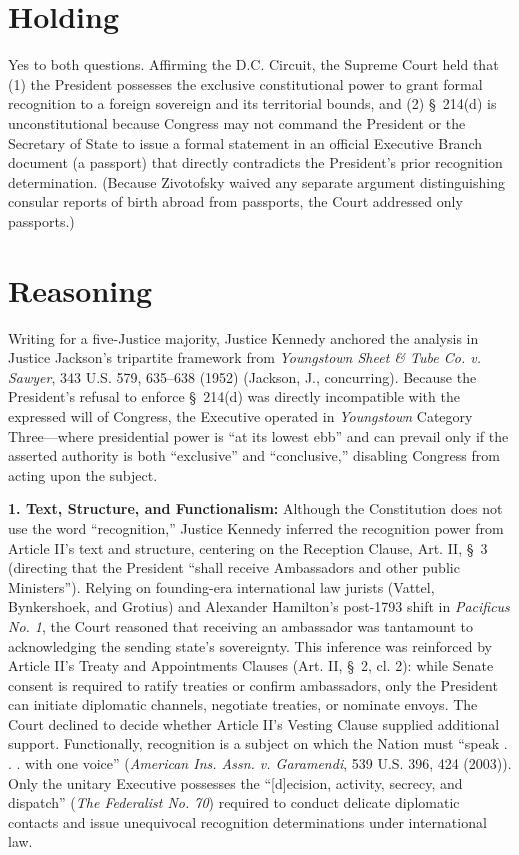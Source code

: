 \documentclass[12pt]{article}
\begin{document}
\section{Holding}
Yes to both questions. Affirming the D.C. Circuit, the Supreme Court held that (1) the President possesses the exclusive constitutional power to grant formal recognition to a foreign sovereign and its territorial bounds, and (2) \S~214(d) is unconstitutional because Congress may not command the President or the Secretary of State to issue a formal statement in an official Executive Branch document (a passport) that directly contradicts the President's prior recognition determination. (Because Zivotofsky waived any separate argument distinguishing consular reports of birth abroad from passports, the Court addressed only passports.)

\section{Reasoning}
Writing for a five-Justice majority, Justice Kennedy anchored the analysis in Justice Jackson's tripartite framework from \textit{Youngstown Sheet \& Tube Co. v. Sawyer}, 343 U.S. 579, 635--638 (1952) (Jackson, J., concurring). Because the President's refusal to enforce \S~214(d) was directly incompatible with the expressed will of Congress, the Executive operated in \textit{Youngstown} Category Three---where presidential power is ``at its lowest ebb'' and can prevail only if the asserted authority is both ``exclusive'' and ``conclusive,'' disabling Congress from acting upon the subject.

\textbf{1. Text, Structure, and Functionalism:} Although the Constitution does not use the word ``recognition,'' Justice Kennedy inferred the recognition power from Article II's text and structure, centering on the Reception Clause, Art. II, \S~3 (directing that the President ``shall receive Ambassadors and other public Ministers''). Relying on founding-era international law jurists (Vattel, Bynkershoek, and Grotius) and Alexander Hamilton's post-1793 shift in \textit{Pacificus No. 1}, the Court reasoned that receiving an ambassador was tantamount to acknowledging the sending state's sovereignty. This inference was reinforced by Article II's Treaty and Appointments Clauses (Art. II, \S~2, cl. 2): while Senate consent is required to ratify treaties or confirm ambassadors, only the President can initiate diplomatic channels, negotiate treaties, or nominate envoys. The Court declined to decide whether Article II's Vesting Clause supplied additional support. Functionally, recognition is a subject on which the Nation must ``speak . . . with one voice'' (\textit{American Ins. Assn. v. Garamendi}, 539 U.S. 396, 424 (2003)). Only the unitary Executive possesses the ``[d]ecision, activity, secrecy, and dispatch'' (\textit{The Federalist No. 70}) required to conduct delicate diplomatic contacts and issue unequivocal recognition determinations under international law.
\end{document}
